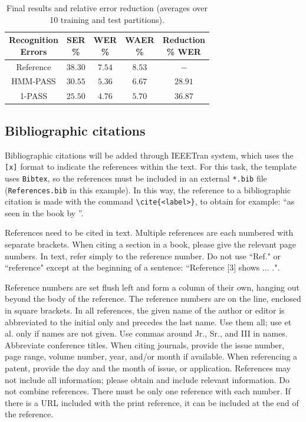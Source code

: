 \documentclass[eng]{ajceam-class}
\begin{document}
\begin{table}[!b]
 \centering
  \caption{Final results and relative error reduction (averages over 10 training and test partitions).} \label{table-1}
 {\small
 \begin{tabular}{ccccc}
  \hline
  \hline
  \thead{Recognition \\ Errors} & \thead{SER \\ \%} & \thead{WER \\ \%} & \thead{WAER \\ \%} &
                        \thead{Reduction \\ \% WER} \\
  \hline
  \hline
  Reference & $38.30$ & $7.54$ & $8.53$ & $-$ \\
  \hline
  HMM-PASS & $30.55$ & $5.36$ & $6.67$ & $28.91$ \\
  1-PASS & $25.50$ & $4.76$ & $5.70$ & $36.87$   \\
  \hline
  \hline
 \end{tabular}}
\end{table}

\subsection{Bibliographic citations}

Bibliographic citations will be added through IEEETran system, which uses the \texttt{[x]} format to indicate the references within the text. For this task, the template uses \texttt{Bibtex}, so the references must be included in an external \texttt{*.bib} file (\texttt{References.bib} in this example). In this way, the reference to a bibliographic citation is made with the command \verb!\cite{<label>}!, to obtain for example: ``as seen in the book by \cite{Mitchell2001}''.

References need to be cited in text. Multiple references are each numbered with separate brackets. When citing a section in a book, please give the relevant page numbers. In text, refer simply to the reference number. Do not use ``Ref." or ``reference" except at the beginning of a sentence: ``Reference [3] shows ... .".

Reference numbers are set flush left and form a column of their own, hanging out beyond the body of the reference. The reference numbers are on the line, enclosed in square brackets. In all references, the given name of the author or editor is abbreviated to the initial only and precedes the last name. Use them all; use et al. only if names are not given. Use commas around Jr., Sr., and III in names. Abbreviate conference titles.  When citing journals, provide the issue number, page range, volume number, year, and/or month if available. When referencing a patent, provide the day and the month of issue, or application. References may not include all information; please obtain and include relevant information. Do not combine references. There must be only one reference with each number. If there is a URL included with the print reference, it can be included at the end of the reference.
\end{document}
